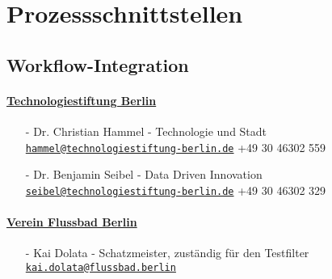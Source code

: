 \section{Prozessschnittstellen}


\subsection{Workflow-Integration}


\paragraph{\uline{Technologiestiftung Berlin}}
\begin{itemize}
\item[-] Dr. Christian Hammel - Technologie und Stadt\newline
\href{hammel@technologiestiftung-berlin.de}{\nolinkurl{hammel@technologiestiftung-berlin.de}} \newline
		+49 30 46302 559
\item[-] Dr. Benjamin Seibel  - Data Driven Innovation\newline
		\href{seibel@technologiestiftung-berlin.de}{\nolinkurl{seibel@technologiestiftung-berlin.de}} \newline
		+49 30 46302 329
\end{itemize}

\paragraph{\uline{Verein Flussbad Berlin}}
\begin{itemize}
\item[-] Kai Dolata - Schatzmeister, zuständig für den Testfilter\newline
\href{kai.dolata@flussbad.berlin}{\nolinkurl{kai.dolata@flussbad.berlin}}
\end{itemize}